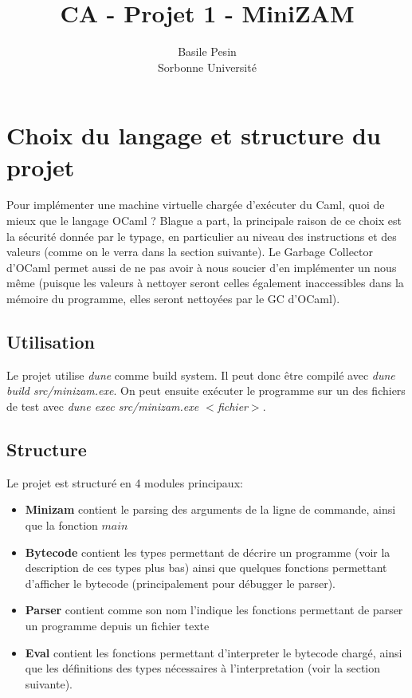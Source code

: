 \documentclass{article}
\title{CA - Projet 1 - MiniZAM}
\author{Basile Pesin\\Sorbonne Université}
\begin{document}
\maketitle

\section{Choix du langage et structure du projet}

Pour implémenter une machine virtuelle chargée d'exécuter du Caml, quoi de mieux que le langage OCaml ? Blague a part, la principale raison de ce choix est la sécurité donnée par le typage, en particulier au niveau des instructions et des valeurs (comme on le verra dans la section suivante). Le Garbage Collector d'OCaml permet aussi de ne pas avoir à nous soucier d'en implémenter un nous même (puisque les valeurs à nettoyer seront celles également inaccessibles dans la mémoire du programme, elles seront nettoyées par le GC d'OCaml).\\

\subsection{Utilisation}

Le projet utilise \textit{dune} comme build system. Il peut donc être compilé avec \textit{dune build src/minizam.exe}. On peut ensuite exécuter le programme sur un des fichiers de test avec \textit{dune exec src/minizam.exe $<$fichier$>$}.

\subsection{Structure}

Le projet est structuré en 4 modules principaux:
\begin{itemize}
  \item \textbf{Minizam} contient le parsing des arguments de la ligne de commande, ainsi que la fonction $main$
  \item \textbf{Bytecode} contient les types permettant de décrire un programme (voir la description de ces types plus bas) ainsi que quelques fonctions permettant d'afficher le bytecode (principalement pour débugger le parser).
  \item \textbf{Parser} contient comme son nom l'indique les fonctions permettant de parser un programme depuis un fichier texte
  \item \textbf{Eval} contient les fonctions permettant d'interpreter le bytecode chargé, ainsi que les définitions des types nécessaires à l'interpretation (voir la section suivante).
\end{itemize}
\end{document}
